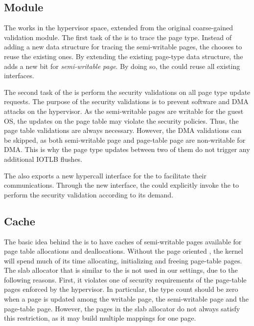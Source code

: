 \subsection{\name Module}\label{sec:module}
The \module works in the hypervisor space, extended from the original coarse-gained validation module.
The first task of the \module is to trace the page type.
Instead of adding a new data structure for tracing the semi-writable pages, the \module chooses to reuse the existing ones.
By extending the existing page-type data structure, the \module adds a new bit for \emph{semi-writable page}.
By doing so, the \module could reuse all existing interfaces.

The second task of the \module is perform the security validations on all page type update requests.
The purpose of the security validations is to prevent software and DMA attacks on the hypervisor.
As the semi-writable pages are writable for the guest OS, the updates on the page table may violate the security policies. Thus, the page table validations are always necessary.
However, the DMA validations can be skipped, as both semi-writable page and page-table page are non-writable for DMA.
This is why the page type updates between two of them do not trigger any additional IOTLB flushes.

The \module also exports a new hypercall interface for the \cache to facilitate their communications.
Through the new interface, the \cache could explicitly invoke the \module to perform the security validation according to its demand.

\subsection{\name Cache}\label{sec:cache}
The basic idea behind the \cache is to have caches of semi-writable pages available for page table allocations and deallocations.
Without the page oriented \cache, the kernel will spend much of its time allocating, initializing and freeing page-table pages.
The slab allocator that is similar to the \cache is not used in our settings, due to the following reasons.
First, it violates one of security requirements of the page-table pages enforced by the hypervisor.
In particular, the type count should be zero when a page is updated among the writable page, the semi-writable page and the page-table page.
However, the pages in the slab allocator do not always satisfy this restriction, as it may build multiple mappings for one page.

